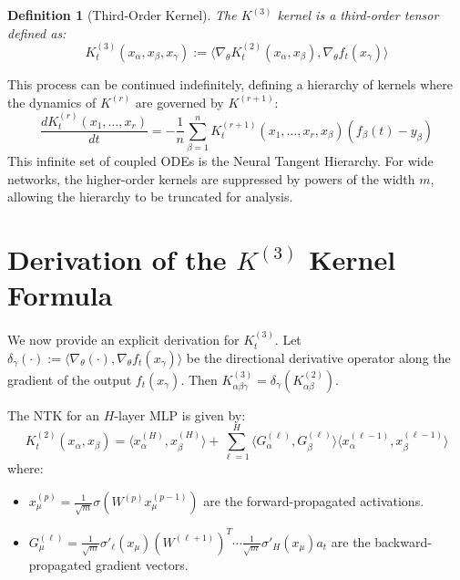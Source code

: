 \documentclass{article}
\newtheorem{definition}[theorem]{Definition}
\begin{document}
\begin{definition}[Third-Order Kernel]
The $K^{(3)}$ kernel is a third-order tensor defined as:
\begin{equation}
K^{(3)}_t(x_\alpha, x_\beta, x_\gamma) := \langle \nabla_\theta K^{(2)}_t(x_\alpha, x_\beta), \nabla_\theta f_t(x_\gamma) \rangle
\end{equation}
\end{definition}

This process can be continued indefinitely, defining a hierarchy of kernels where the dynamics of $K^{(r)}$ are governed by $K^{(r+1)}$:
\begin{equation}
\frac{dK_t^{(r)}(x_1, \dots, x_r)}{dt} = -\frac{1}{n} \sum_{\beta=1}^n K^{(r+1)}_t(x_1, \dots, x_r, x_\beta)(f_\beta(t)-y_\beta)
\end{equation}
This infinite set of coupled ODEs is the Neural Tangent Hierarchy. For wide networks, the higher-order kernels are suppressed by powers of the width $m$, allowing the hierarchy to be truncated for analysis.

\section{Derivation of the $K^{(3)}$ Kernel Formula}

We now provide an explicit derivation for $K^{(3)}_t$. Let $\delta_\gamma(\cdot) := \langle \nabla_\theta (\cdot), \nabla_\theta f_t(x_\gamma) \rangle$ be the directional derivative operator along the gradient of the output $f_t(x_\gamma)$. Then $K^{(3)}_{\alpha\beta\gamma} = \delta_\gamma(K^{(2)}_{\alpha\beta})$.

The NTK for an $H$-layer MLP is given by:
\begin{equation}
K^{(2)}_t(x_\alpha, x_\beta) = \langle x^{(H)}_\alpha, x^{(H)}_\beta \rangle + \sum_{\ell=1}^{H} \langle G^{(\ell)}_\alpha, G^{(\ell)}_\beta \rangle \langle x^{(\ell-1)}_\alpha, x^{(\ell-1)}_\beta \rangle
\end{equation}
where:
\begin{itemize}
    \item $x^{(p)}_\mu = \frac{1}{\sqrt{m}}\sigma(W^{(p)} x^{(p-1)}_\mu)$ are the forward-propagated activations.
    \item $G^{(\ell)}_\mu = \frac{1}{\sqrt{m}}\sigma'_\ell(x_\mu) (W^{(\ell+1)})^T \cdots \frac{1}{\sqrt{m}}\sigma'_H(x_\mu) a_t$ are the backward-propagated gradient vectors.
\end{itemize}
\end{document}
